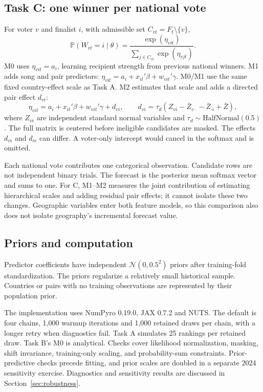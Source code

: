 \documentclass[11pt,a4paper]{article}
\newcommand{\Prob}{\mathbb P}
\newcommand{\Normal}{\mathcal N}
\begin{document}
\subsection{Task C: one winner per national vote}
For voter $v$ and finalist $i$, with admissible set $C_{vt}=F_t\setminus\{v\}$,
\begin{equation}
 \Prob(W_{vt}=i\mid\theta)=
 \frac{\exp(\eta_{vit})}{\sum_{j\in C_{vt}}\exp(\eta_{vjt})}.
\end{equation}
M0 uses $\eta_{vit}=a_i$, learning recipient strength from previous national winners. M1 adds song and pair predictors: $\eta_{vit}=a_i+x_{it}'\beta+w_{vit}'\gamma$. M0/M1 use the same fixed country-effect scale as Task A. M2 estimates that scale and adds a directed pair effect $d_{vi}$:
\begin{equation}
 \eta_{vit}=a_i+x_{it}'\beta+w_{vit}'\gamma+d_{vi},\qquad
 d_{vi}=\tau_d(Z_{vi}-\bar Z_{v\cdot}-\bar Z_{\cdot i}+\bar Z),
\end{equation}
where $Z_{vi}$ are independent standard normal variables and
$\tau_d\sim\mathrm{HalfNormal}(0.5)$. The full matrix is centered before ineligible candidates are masked. The effects $d_{vi}$ and $d_{iv}$ can differ. A voter-only intercept would cancel in the softmax and is omitted.

Each national vote contributes one categorical observation. Candidate rows are not independent binary trials. The forecast is the posterior mean softmax vector and sums to one. For C, M1--M2 measures the joint contribution of estimating hierarchical scales and adding residual pair effects; it cannot isolate these two changes. Geographic variables enter both feature models, so this comparison also does not isolate geography's incremental forecast value.

\subsection{Priors and computation}
Predictor coefficients have independent $\Normal(0,0.5^2)$ priors after training-fold standardization. The priors regularize a relatively small historical sample. Countries or pairs with no training observations are represented by their population prior.

The implementation uses NumPyro 0.19.0, JAX 0.7.2 and NUTS. The default is four chains, 1,000 warmup iterations and 1,000 retained draws per chain, with a longer retry when diagnostics fail. Task A simulates 25 rankings per retained draw. Task B's M0 is analytical. Checks cover likelihood normalization, masking, shift invariance, training-only scaling, and probability-sum constraints. Prior-predictive checks precede fitting, and prior scales are doubled in a separate 2024 sensitivity exercise. Diagnostics and sensitivity results are discussed in Section~\ref{sec:robustness}.
\end{document}
